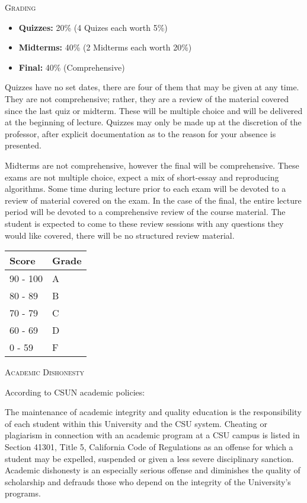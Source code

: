 \documentclass{letter}
\newcommand{\heading}[1]{{\large \textsc{#1}}}
\begin{document}
\heading{Grading}

\begin{itemize}
  \item[] {\bf Quizzes:} 20\% (4 Quizes each worth 5\%)
  \item[] {\bf Midterms:} 40\% (2 Midterms each worth 20\%)
  \item[] {\bf Final:} 40\% (Comprehensive)
\end{itemize}

Quizzes have no set dates, there are four of them that may be given at any
time.  They are not comprehensive; rather, they are a review of the material
covered since the last quiz or midterm.  These will be multiple choice and will
be delivered at the beginning of lecture.  Quizzes may only be made up at the
discretion of the professor, after explicit documentation as to the reason for
your absence is presented.

Midterms are not comprehensive, however the final will be comprehensive.  These
exams are not multiple choice, expect a mix of short-essay and reproducing
algorithms.  Some time during lecture prior to each exam will be devoted to a
review of material covered on the exam.  In the case of the final, the entire
lecture period will be devoted to a comprehensive review of the course
material.  The student is expected to come to these review sessions with any
questions they would like covered, there will be no structured review material.

\begin{center}
  \begin{tabular}{ l | l }
    {\bf Score} & {\bf Grade} \\
    \hline
    90 - 100 & A \\
    80 - 89 & B \\
    70 - 79 & C \\
    60 - 69 & D \\
    0 - 59 & F \\
  \end{tabular}
\end{center}

\heading{Academic Dishonesty}

According to CSUN academic policies:

\begin{displayquote}
The maintenance of academic integrity and quality education is the
responsibility of each student within this University and the CSU system.
Cheating or plagiarism in connection with an academic program at a CSU campus
is listed in Section 41301, Title 5, California Code of Regulations as an
offense for which a student may be expelled, suspended or given a less severe
disciplinary sanction. Academic dishonesty is an especially serious offense and
diminishes the quality of scholarship and defrauds those who depend on the
integrity of the University's programs.
\end{displayquote}
\end{document}
